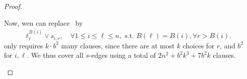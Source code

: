 \documentclass[11pt]{article}
\begin{document}
\begin{proof}
\begin{itemize}
        Now, wen can replace~ by 
        \begin{equation}\label{eq:intro-s2-t}
        \overline{t^{B(i)}_{\ell}} \lor \overline{s_{i, r}}, \quad \forall 1  \leq i \leq \ell \leq n,  \text{ s.t. } B(\ell) = B(i), \forall r > B(i).
        \end{equation}
         only requires $k \cdot b^2$ many clauses, since there are at most $k$ choices for $r$, and $b^2$ for $i, \ell$.
        We thus cover all $s$-edges using a total of $2n^2 + b^2  k^3 + 7 b^2  k$ clauses.
        


\end{itemize}
\end{proof}
\end{document}
